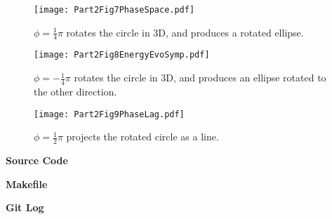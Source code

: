 \documentclass[8pt]{article}
\begin{document}
\begin{figure}[H]
\centering
\texttt{[image: Part2Fig7PhaseSpace.pdf]}
\caption{$\phi = \frac{1}{4}\pi$ rotates the circle in 3D, and produces a rotated ellipse. } 
\label{fig:phi45}
\end{figure} 

\begin{figure}[H]
\centering
\texttt{[image: Part2Fig8EnergyEvoSymp.pdf]}
\caption{$\phi = -\frac{1}{4}\pi$ rotates the circle in 3D, and produces an ellipse rotated to the other direction. } 
\label{fig:phi-45}
\end{figure} 

\begin{figure}[H]
\centering
\texttt{[image: Part2Fig9PhaseLag.pdf]}
\caption{$\phi = \frac{1}{2}\pi$ projects the rotated circle as a line. } 
\label{fig:phi90}
\end{figure} 


\noindent \textbf{Source Code}
 

\noindent \textbf{Makefile}


\noindent \textbf{Git Log}

\end{document}
